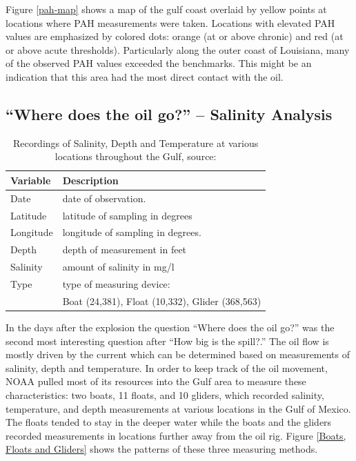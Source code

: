 \documentclass[authoryear,12pt]{elsarticle}
\begin{document}
Figure \ref{pah-map} shows a map of the gulf coast overlaid by yellow points at locations where PAH measurements were taken. Locations with elevated PAH values are emphasized by colored dots: orange (at or above chronic) and red (at or above acute thresholds).  Particularly along the outer coast of Louisiana, many of the observed PAH values exceeded the benchmarks.  This might be an indication that this area had the most direct contact with the oil.  

\subsection{``Where does the oil go?'' -- Salinity Analysis}

\begin{table}
\begin{tabular}{lp{9.5cm}}\hline
\bf Variable & \bf Description \\\hline
Date & date of observation. \\
Latitude & latitude {of sampling} in degrees \\
Longitude & longitude {of sampling} in degrees. \\
Depth & depth of measurement in feet \\
Salinity &  amount of salinity in mg/l \\
Type &  type of measuring device: \\
& {\small Boat (24,381), Float (10,332), Glider (368,563)} \\\hline
\end{tabular}
\label{table.salinity}
\caption{Recordings of Salinity, Depth and Temperature at various locations throughout the Gulf, source: \citet{salinity}}
\end{table}

In the days after the explosion the question ``Where does the oil go?'' was the second most interesting question after ``How big is the spill?.''  The oil flow is mostly driven by the current which can be determined based on measurements of salinity, depth and temperature. 
In order to keep track of the oil movement, NOAA pulled most of its resources into the Gulf area to measure these characteristics: {two} boats, 11 floats, and 10 gliders, which recorded salinity, temperature, and depth measurements at various locations in the Gulf of Mexico. 
The floats tended to stay in the deeper water while the boats and the gliders recorded measurements in locations further away from the oil rig.  Figure \ref{Boats, Floats and Gliders} show{s} the patterns of these three measuring methods. 
\end{document}
